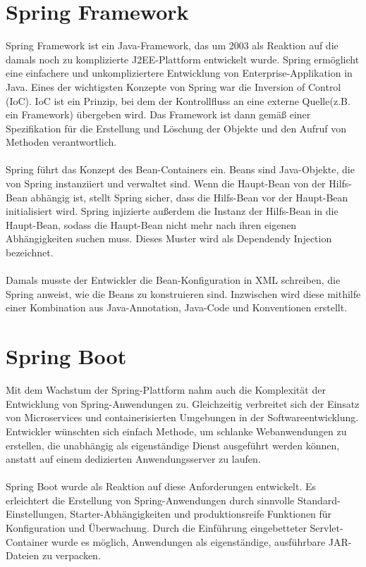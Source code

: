 \documentclass[a4paper,12pt]{scrreprt}
\begin{document}
\section{Spring Framework}
Spring Framework ist ein Java-Framework, das um 2003 als Reaktion auf die damals noch zu komplizierte J2EE-Plattform entwickelt wurde. Spring ermöglicht eine einfachere und unkompliziertere Entwicklung von Enterprise-Applikation in Java. Eines der wichtigsten Konzepte von Spring war die Inversion of Control (IoC).
IoC ist ein Prinzip, bei dem der Kontrollfluss an eine externe Quelle(z.B. ein Framework) übergeben wird. Das Framework ist dann gemäß einer Spezifikation für die Erstellung und Löschung der Objekte und den Aufruf von Methoden verantwortlich. \\ \\ Spring führt das Konzept des Bean-Containers ein. Beans sind Java-Objekte, die von Spring instanziiert und verwaltet sind. Wenn die Haupt-Bean von der Hilfs-Bean abhängig ist, stellt Spring sicher, dass die Hilfs-Bean vor der Haupt-Bean initialisiert wird. Spring injizierte außerdem die Instanz der Hilfs-Bean in die Haupt-Bean, sodass die Haupt-Bean nicht mehr nach ihren eigenen Abhängigkeiten suchen muss. Dieses Muster wird als Dependendy Injection bezeichnet.\\ \\
Damals musste der Entwickler die Bean-Konfiguration in XML schreiben, die Spring anweist, wie die Beans zu konstruieren sind. Inzwischen wird diese mithilfe einer Kombination aus Java-Annotation, Java-Code und Konventionen erstellt.
\section{Spring Boot}
Mit dem Wachstum der Spring-Plattform nahm auch die Komplexität der Entwicklung von Spring-Anwendungen zu. Gleichzeitig verbreitet sich der Einsatz von Microservices und containerisierten Umgebungen in der Softwareentwicklung. Entwickler wünschten sich einfach Methode, um schlanke Webanwendungen zu erstellen, die unabhängig als eigenständige Dienst ausgeführt werden können, anstatt auf einem dedizierten Anwendungsserver zu laufen.\\ \\
Spring Boot wurde als Reaktion auf diese Anforderungen entwickelt. Es erleichtert die Erstellung von Spring-Anwendungen durch sinnvolle Standard-Einstellungen, Starter-Abhängigkeiten und produktionsreife Funktionen für Konfiguration und Überwachung. Durch die Einführung eingebetteter Servlet-Container wurde es möglich, Anwendungen als eigenständige, ausführbare JAR-Dateien zu verpacken. 
\end{document}
